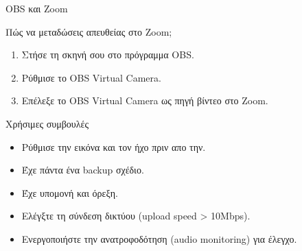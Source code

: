 \documentclass[aspectratio=169]{beamer}
\begin{document}
\begin{frame}{OBS και Zoom}
  \begin{block}{Πώς να μεταδώσεις απευθείας στο Zoom;}
    \begin{enumerate}
      \item Στήσε τη σκηνή σου στο πρόγραμμα OBS.
      \item Ρύθμισε το OBS Virtual Camera.
      \item Επέλεξε το OBS Virtual Camera ως πηγή βίντεο στο Zoom.
    \end{enumerate}
  \end{block}
  \begin{exampleblock}{Χρήσιμες συμβουλές}
    \begin{itemize}
      \item Ρύθμισε την εικόνα και τον ήχο πριν απο την.
      \item Έχε πάντα ένα backup σχέδιο.
      \item Έχε υπομονή και όρεξη.
      \item Ελέγξτε τη σύνδεση δικτύου (upload speed > 10Mbps).
      \item Ενεργοποιήστε την ανατροφοδότηση (audio monitoring) για έλεγχο.
    \end{itemize}
  \end{exampleblock}
\end{frame}
\end{document}
